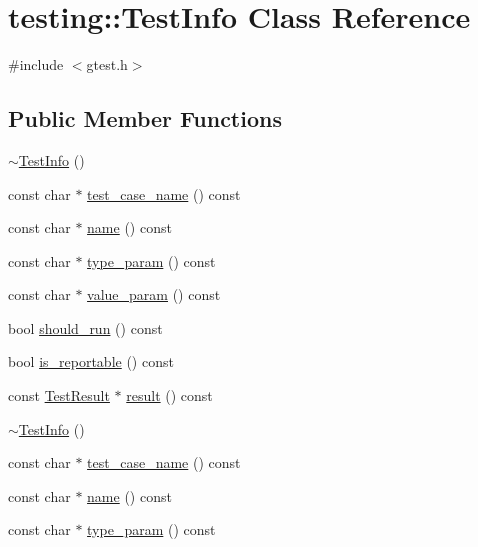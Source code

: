\hypertarget{classtesting_1_1_test_info}{\section{testing\-:\-:Test\-Info Class Reference}
\label{classtesting_1_1_test_info}
}


{\ttfamily \#include $<$gtest.\-h$>$}

\subsection*{Public Member Functions}
\begin{DoxyCompactItemize}
\item 
\hyperlink{classtesting_1_1_test_info_a8d382c1b1b511f0d9112c14684809852}{$\sim$\-Test\-Info} ()
\item 
const char $\ast$ \hyperlink{classtesting_1_1_test_info_a26d22556d04b94c9cd15e28d74fef91c}{test\-\_\-case\-\_\-name} () const 
\item 
const char $\ast$ \hyperlink{classtesting_1_1_test_info_ab3d24cad310f0cde29a80b9a83949ff5}{name} () const 
\item 
const char $\ast$ \hyperlink{classtesting_1_1_test_info_af15d5c533a7237ffc183bc4c924dfcf4}{type\-\_\-param} () const 
\item 
const char $\ast$ \hyperlink{classtesting_1_1_test_info_a9671fbc0effcb32e98803888dc166a66}{value\-\_\-param} () const 
\item 
bool \hyperlink{classtesting_1_1_test_info_a240c9fb051d7b0586ed380c6b4e729e4}{should\-\_\-run} () const 
\item 
bool \hyperlink{classtesting_1_1_test_info_a7ad90aeebb1d6fe3a43c6e3e3427e382}{is\-\_\-reportable} () const 
\item 
const \hyperlink{classtesting_1_1_test_result}{Test\-Result} $\ast$ \hyperlink{classtesting_1_1_test_info_addea8766df3b8abe4cc4103218a49a65}{result} () const 
\item 
\hyperlink{classtesting_1_1_test_info_a8d382c1b1b511f0d9112c14684809852}{$\sim$\-Test\-Info} ()
\item 
const char $\ast$ \hyperlink{classtesting_1_1_test_info_a26d22556d04b94c9cd15e28d74fef91c}{test\-\_\-case\-\_\-name} () const 
\item 
const char $\ast$ \hyperlink{classtesting_1_1_test_info_ab3d24cad310f0cde29a80b9a83949ff5}{name} () const 
\item 
const char $\ast$ \hyperlink{classtesting_1_1_test_info_af15d5c533a7237ffc183bc4c924dfcf4}{type\-\_\-param} () const 

\end{DoxyCompactItemize}
